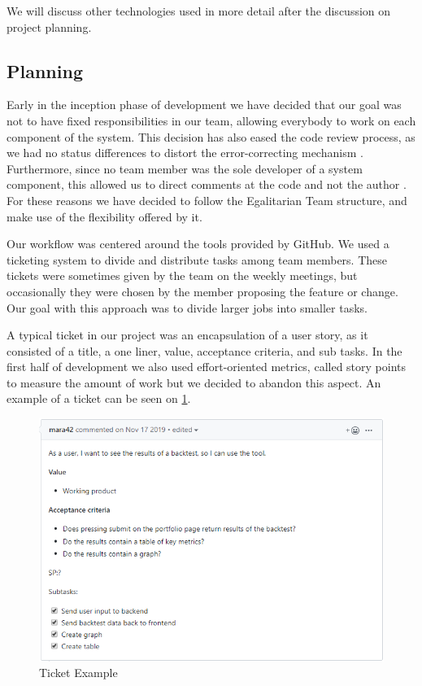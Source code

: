 \documentclass[main.tex]{subfiles}
\begin{document}
We will discuss other technologies used in more detail after the discussion on project planning.

\subsection{Planning}

Early in the inception phase of development we have decided that our goal was not to have fixed responsibilities in our team, allowing everybody to work on each component of the system. This decision has also eased the code review process, as we had no status differences to distort the error-correcting mechanism \cite{statusdifference}. Furthermore, since no team member was the sole developer of a system component, this allowed us to direct comments at the code and not the author \cite{howtoreview}. For these reasons we have decided to follow the Egalitarian Team structure, and make use of the flexibility offered by it. 

Our workflow was centered around the tools provided by GitHub. We used a ticketing system to divide and distribute tasks among team members. These tickets were sometimes given by the team on the weekly meetings, but occasionally they were chosen by the member proposing the feature or change. Our goal with this approach was to divide larger jobs into smaller tasks. 

A typical ticket in our project was an encapsulation of a user story, as it consisted of a title, a one liner, value, acceptance criteria, and sub tasks. In the first half of development we also used effort-oriented metrics, called story points to measure the amount of work but we decided to abandon this aspect. An example of a ticket can be seen on \figurename{\ref{Ticket}}.

\begin{figure}[H]
   \centering
   \includegraphics[scale=0.7]{05Coding/05Pictures/ticket.png}
   \caption{Ticket Example}
   \label{Ticket}
\end{figure}
\end{document}

